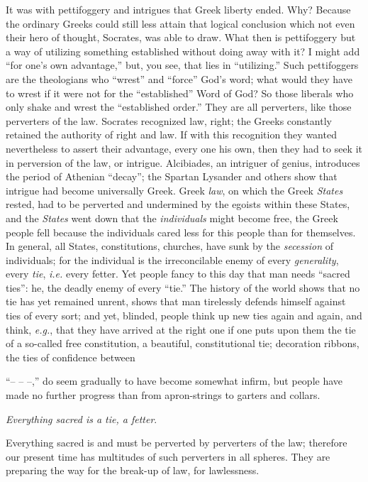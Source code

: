 It was with pettifoggery and intrigues that Greek liberty ended. Why? Because 
the ordinary Greeks could still less attain that logical conclusion which not 
even their hero of thought, Socrates, was able to draw. What then is 
pettifoggery but a way of utilizing something established without doing away 
with it? I might add ``for one's own advantage,'' but, you see, that lies in 
``utilizing.'' Such pettifoggers are the theologians who ``wrest'' and 
``force'' God's word; what would they have to wrest if it were not for the 
``established'' Word of God? So those liberals who only shake and wrest the 
``established order.'' They are all perverters, like those perverters of the 
law. Socrates recognized law, right; the Greeks constantly retained the 
authority of right and law. If with this recognition they wanted nevertheless 
to assert their advantage, every one his own, then they had to seek it in 
perversion of the law, or intrigue. Alcibiades, an intriguer of genius, 
introduces the period of Athenian ``decay''; the Spartan Lysander and others 
show that intrigue had become universally Greek. Greek \textit{law}, on which 
the Greek \textit{States} rested, had to be perverted and undermined by the 
egoists within these States, and the \textit{States} went down that the 
\textit{individuals} might become free, the Greek people fell because the 
individuals cared less for this people than for themselves. In general, all 
States, constitutions, churches, have sunk by the \textit{secession} of 
individuals; for the individual is the irreconcilable enemy of every 
\textit{generality}, every \textit{tie}, \textit{i.e.} every fetter. Yet 
people fancy to this day that man needs ``sacred ties'': he, the deadly 
enemy of every ``tie.'' The history of the world shows that no tie has yet 
remained unrent, shows that man tirelessly defends himself against ties of 
every sort; and yet, blinded, people think up new ties again and again, and 
think, \textit{e.g.}, that they have arrived at the right one if one puts upon 
them the tie of a so-called free constitution, a beautiful, constitutional 
tie; decoration ribbons, the ties of confidence between

``-- -- --,'' do seem gradually to have become somewhat infirm, but people 
have made no further progress than from apron-strings to garters and collars.

\textit{Everything sacred is a tie, a fetter}.

Everything sacred is and must be perverted by perverters of the law; therefore 
our present time has multitudes of such perverters in all spheres. They are 
preparing the way for the break-up of law, for lawlessness.


